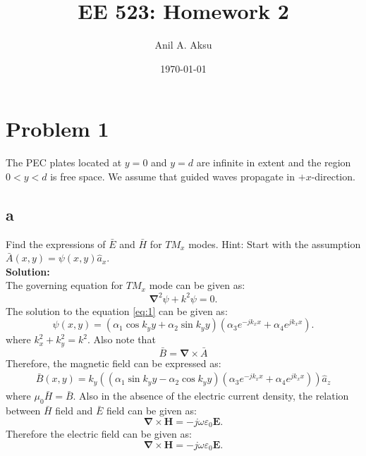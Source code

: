 \documentclass[11pt]{amsart}
\title{EE 523: Homework 2}
\author{Anil A. Aksu}
\date{\today}
\begin{document}
\maketitle

\section*{Problem 1 }
The PEC plates located at $y=0$ and $y=d$ are infinite in extent and the region $0<y<d$ is
free space. We assume that guided waves propagate in $+x$-direction.

\subsection*{a}
Find the expressions of $\bar{E}$ and $\bar{H}$ for $TM_x$ modes. Hint: Start with the assumption $\bar{A}(x,y)=\psi(x,y)\hat{a}_x$.
\\
\textbf{Solution:}\\
The governing equation for $TM_x$ mode can be given as:
\begin{equation}
\label{eq:1}
 \mathbf{\nabla}^2 \psi +k^2 \psi=0.
\end{equation}
The solution to the equation \ref{eq:1} can be given as:
\begin{equation}
\label{eq:2}
\psi(x,y)= (\alpha_1 \cos k_y y +\alpha_2 \sin k_y y)(\alpha_3 e^{-j k_x x}+\alpha_4 e^{j k_x x}).
\end{equation}
where $k_{x}^2+k_{y}^2=k^2$. Also note that
\begin{equation}
\label{eq:3}
\bar{B}=\mathbf{\nabla}\times \bar{A}
\end{equation}
Therefore, the magnetic field can be expressed as:
\begin{equation}
\label{eq:4}
\begin{split}
\bar{B}(x,y)= k_y((\alpha_1 \sin k_y y -\alpha_2 \cos k_y y)(\alpha_3 e^{-j k_x x}+\alpha_4 e^{j k_x x}))\hat{a}_z
\end{split}
\end{equation}
where $\mu_0 \bar{H}=\bar{B}$. Also in the absence of the electric current density, the relation between $\bar{H}$ field and $\bar{E}$ field can be given as:
\begin{equation}
\label{eq:5}
 \mathbf{\nabla}\times \mathbf{H}=-j \omega \varepsilon_0 \mathbf{E}.
\end{equation}
Therefore the electric field can be given as:
\begin{equation}
\label{eq:6}
 \mathbf{\nabla}\times \mathbf{H}=-j \omega \varepsilon_0 \mathbf{E}.
\end{equation}
\end{document}

